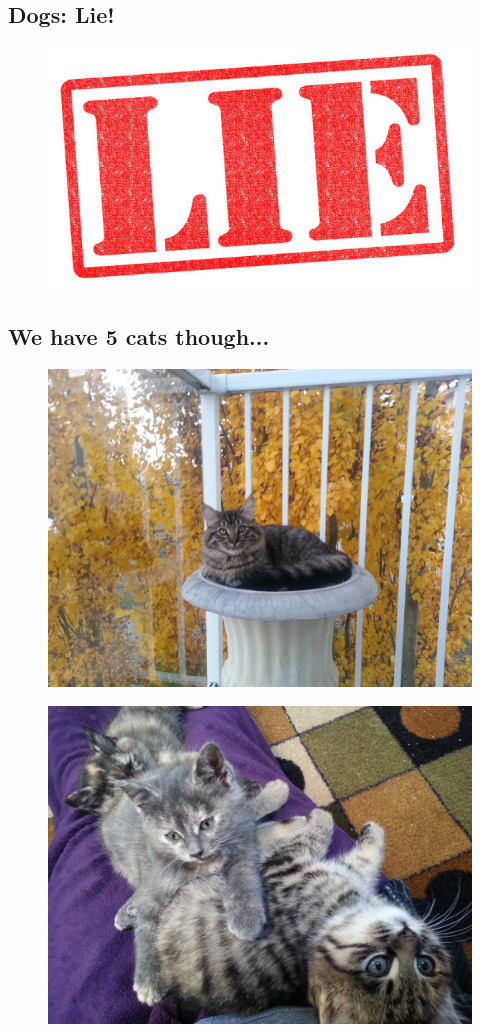 \clearpage

\subsection*{Dogs:  \color{red}  Lie!}

\begin{figure}[h]
	\centering\includegraphics[width=0.4\linewidth]{images/lie.jpg}
\end{figure}

\clearpage

\subsection*{We have 5 cats though...}

\begin{figure}[h]
	\centering\includegraphics[width=0.5\linewidth]{images/creampuff.jpg}
\end{figure}

\clearpage

\begin{figure}[h]
	\centering\includegraphics[width=0.6\linewidth]{images/kittens.jpg}
\end{figure}

